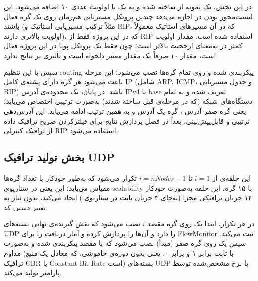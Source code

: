 \documentclass{article}
\begin{document}
	در این بخش، یک نمونه از  ساخته شده و به یک  با اولویت عددی ۱۰ اضافه می‌شود. این لیست‌محور بودن 
	در  اجازه می‌دهد چندین پروتکل مسیریابی هم‌زمان روی یک گره فعال باشند (مثلاً ترکیب مسیریابی استاتیک و RIP، که در آن مسیرهای استاتیک معمولاً اولویت بالاتری دارند)، که در این پروژه فقط از RIP استفاده شده است. مقدار اولویت کمتر در  به‌معنای ارجحیت بالاتر است؛ چون فقط یک پروتکل پویا در این پروژه فعال است، مقدار ۱۰ صرفاً یک مقدار معتبر دلخواه است و تأثیری بر نتایج ندارد.
	
	سپس  با این تنظیم routing پیکربندی شده و روی تمام گره‌ها نصب می‌شود؛ این مرحله باعث می‌شود هر گره دارای پشته‌ی کامل IP (شامل ARP، ICMP، و جدول مسیریابی RIP) باشد. در پایان، یک محدوده‌ی آدرس IPv4 با base  تعریف شده و به تمام دستگاه‌های شبکه (که در مرحله‌ی قبل ساخته شدند) به‌صورت ترتیبی اختصاص می‌یابد؛ یعنی گره صفر آدرس ، گره یک آدرس  و به همین ترتیب ادامه می‌یابد. این آدرس‌دهی ترتیبی و قابل‌پیش‌بینی، بعداً در فصل پردازش نتایج برای فیلترکردن صریح ترافیک داده از ترافیک کنترلی RIP استفاده می‌شود.
	
	\subsection{بخش تولید ترافیک UDP}
	
	\lr{}
	
	این حلقه‌ی  از $i=1$ تا $i=nNodes-1$ تکرار می‌شود که به‌طور خودکار با تعداد گره‌ها مقیاس می‌یابد؛ این یعنی در سناریوی scalability با ۱۵ گره، این حلقه به‌صورت خودکار ۱۴ جریان ترافیکی مجزا (به‌جای ۴ جریان ثابت در سناریوی ) ایجاد می‌کند، بدون نیاز به تغییر دستی کد.
	
	در هر تکرار، ابتدا یک  روی گره مقصد $i$ نصب می‌شود که نقش گیرنده‌ی نهایی بسته‌های UDP را دارد و آن‌ها را پردازش کرده و آمار دریافت را برای FlowMonitor ثبت می‌کند. سپس یک  روی گره صفر (مبدأ) نصب می‌شود که با مقصد  پیکربندی شده و به‌صورت مداوم (با  ثابت برابر ۱ و  برابر ۰، یعنی بدون دوره‌ی خاموشی، که معادل یک منبع ترافیک CBR یا Constant Bit Rate است) بسته‌های UDP با نرخ مشخص‌شده توسط پارامتر  تولید می‌کند.
	
\end{document}
